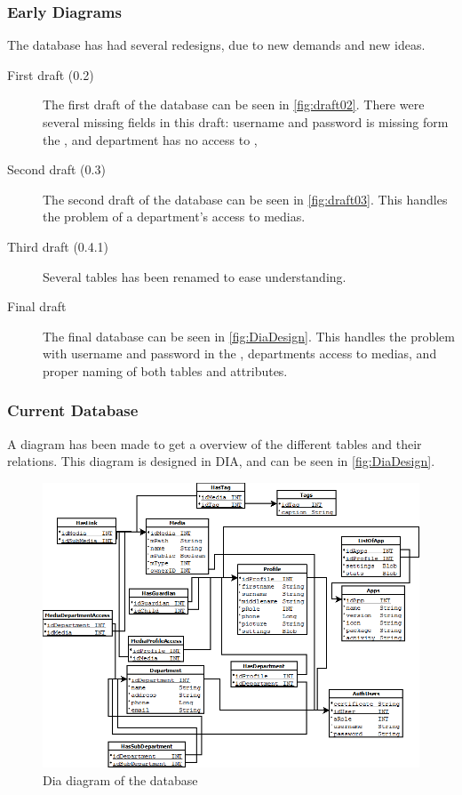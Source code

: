 \subsubsection*{Early Diagrams}
The database has had several redesigns, due to new demands and new ideas.
\begin{description}
	\item[First draft (0.2)] The first draft of the database can be seen in \autoref{fig:draft02}. There were several missing fields in this draft: username and password is missing form the , and department has no access to , 
	\item[Second draft (0.3)] The second draft of the database can be seen in \autoref{fig:draft03}. This handles the problem of a department's access to medias.
	\item[Third draft (0.4.1)] Several tables has been renamed to ease understanding.
	\item[Final draft] The final database can be seen in \autoref{fig:DiaDesign}. This handles the problem with username and password in the , departments access to medias, and proper naming of both tables and attributes.
\end{description}

\subsubsection*{Current Database} %
A diagram has been made to get a overview of the different tables and their relations. This diagram is designed in DIA\cite{Dia}, and can be seen in \autoref{fig:DiaDesign}.

\begin{figure}[htbp]
	\centering
		\includegraphics[width=1.00\textwidth]{images/DiaDesign.png}
	\caption{Dia diagram of the database}
	\label{fig:DiaDesign}
\end{figure}

